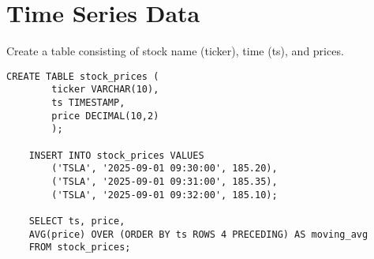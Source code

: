 \documentclass{article}
\begin{document}
	
	
\section{Time Series Data}
 Create a table consisting of stock name (ticker), time (ts), and prices.
\begin{lstlisting}[gobble=1]
	CREATE TABLE stock_prices (
		ticker VARCHAR(10),
		ts TIMESTAMP,
		price DECIMAL(10,2)
		);
	
	INSERT INTO stock_prices VALUES
		('TSLA', '2025-09-01 09:30:00', 185.20),
		('TSLA', '2025-09-01 09:31:00', 185.35),
		('TSLA', '2025-09-01 09:32:00', 185.10);
	
	SELECT ts, price,
	AVG(price) OVER (ORDER BY ts ROWS 4 PRECEDING) AS moving_avg
	FROM stock_prices;
\end{lstlisting}
\end{document}

